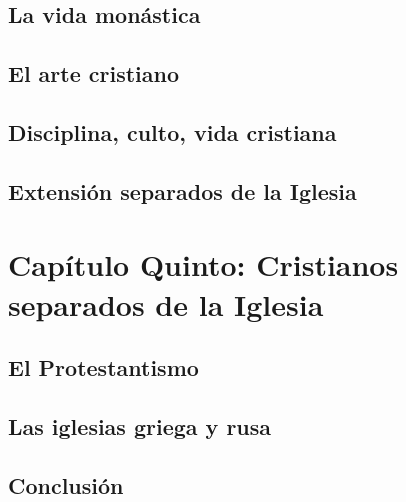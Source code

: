 \raggedbottom{} \documentclass[12pt]{book}
\begin{document}
\section{La vida monástica}
\section{El arte cristiano}
\section{Disciplina, culto, vida cristiana}
\section{Extensión separados de la Iglesia}
\chapter{Capítulo Quinto: Cristianos separados de la Iglesia}
\section{El Protestantismo}
\section{Las iglesias griega y rusa}
\section{Conclusión}
\end{document}
